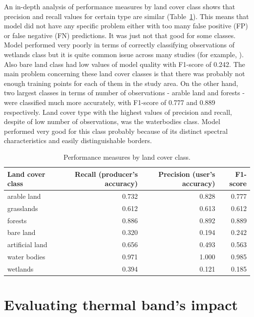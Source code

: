 \documentclass{amuthesis}
\begin{document}
An in-depth analysis of performance measures by land cover class shows
that precision and recall values for certain type are similar
(Table~\ref{tbl-tabela5}). This means that model did not have any
specific problem either with too many false positive (FP) or false
negative (FN) predictions. It was just not that good for some classes.
Model performed very poorly in terms of correctly classifying
observations of wetlands class but it is quite common issue across many
studies (for example, \textcite{malinowski_automated_2020}). Also bare
land class had low values of model quality with F1-score of 0.242. The
main problem concerning these land cover classes is that there was
probably not enough training points for each of them in the study area.
On the other hand, two largest classes in terms of number of
observations - arable land and forests - were classified much more
accurately, with F1-score of 0.777 and 0.889 respectively. Land cover
type with the highest values of precision and recall, despite of low
number of observations, was the waterbodies class. Model performed very
good for this class probably because of its distinct spectral
characteristics and easily distinguishable borders.

\hypertarget{tbl-tabela5}{}
\begin{table}
\caption{\label{tbl-tabela5}Performance measures by land cover class. }\tabularnewline

\centering
\begin{tabular}{|>{}l|>{}r|>{}r|>{}r|}
\toprule
\textbf{Land cover class} & \textbf{Recall (producer's accuracy)} & \textbf{Precision (user's accuracy)} & \textbf{F1-score}\\
\midrule
arable land & 0.732 & 0.828 & 0.777\\
\hline
grasslands & 0.612 & 0.613 & 0.612\\
\hline
forests & 0.886 & 0.892 & 0.889\\
\hline
bare land & 0.320 & 0.194 & 0.242\\
\hline
artificial land & 0.656 & 0.493 & 0.563\\
\hline
water bodies & 0.971 & 1.000 & 0.985\\
\hline
wetlands & 0.394 & 0.121 & 0.185\\
\bottomrule
\end{tabular}
\end{table}


\hypertarget{sec-results-therm}{%
\chapter{Evaluating thermal band's impact}\label{sec-results-therm}}
\end{document}
